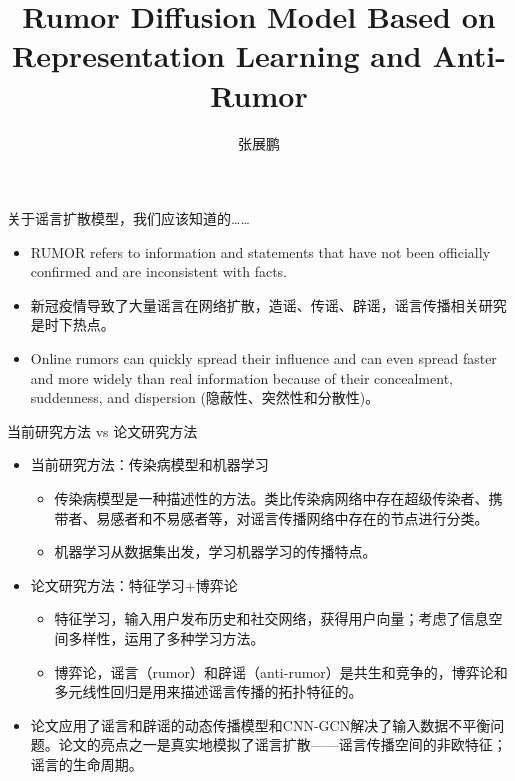 \documentclass{beamer}
\title{Rumor Diffusion Model Based on Representation Learning and Anti-Rumor}
\author{张展鹏}
\begin{document}
\begin{frame}[plain]
    \maketitle
\end{frame}

\begin{frame}{关于谣言扩散模型，我们应该知道的……}
	\begin{itemize}
		\item RUMOR refers to information and statements that have not been officially confirmed and are inconsistent with facts.
		\item 新冠疫情导致了大量谣言在网络扩散，造谣、传谣、辟谣，谣言传播相关研究是时下热点。
		\item Online rumors can quickly spread their influence and can even spread faster and more widely than real information because of their concealment, suddenness, and dispersion (隐蔽性、突然性和分散性)。
	\end{itemize}
\end{frame}

\begin{frame}{当前研究方法 vs 论文研究方法}
	\begin{itemize}
		\item 当前研究方法：传染病模型和机器学习
		\begin{itemize}
			\item 传染病模型是一种描述性的方法。类比传染病网络中存在超级传染者、携带者、易感者和不易感者等，对谣言传播网络中存在的节点进行分类。
			\item 机器学习从数据集出发，学习机器学习的传播特点。
		\end{itemize}
		\item 论文研究方法：特征学习+博弈论
		\begin{itemize}
			\item 特征学习，输入用户发布历史和社交网络，获得用户向量；考虑了信息空间多样性，运用了多种学习方法。
			\item 博弈论，谣言（rumor）和辟谣（anti-rumor）是共生和竞争的，博弈论和多元线性回归是用来描述谣言传播的拓扑特征的。
		\end{itemize}
		\item 论文应用了谣言和辟谣的动态传播模型和CNN-GCN解决了输入数据不平衡问题。论文的亮点之一是真实地模拟了谣言扩散——谣言传播空间的非欧特征；谣言的生命周期。
	\end{itemize}
\end{frame}
\end{document}
